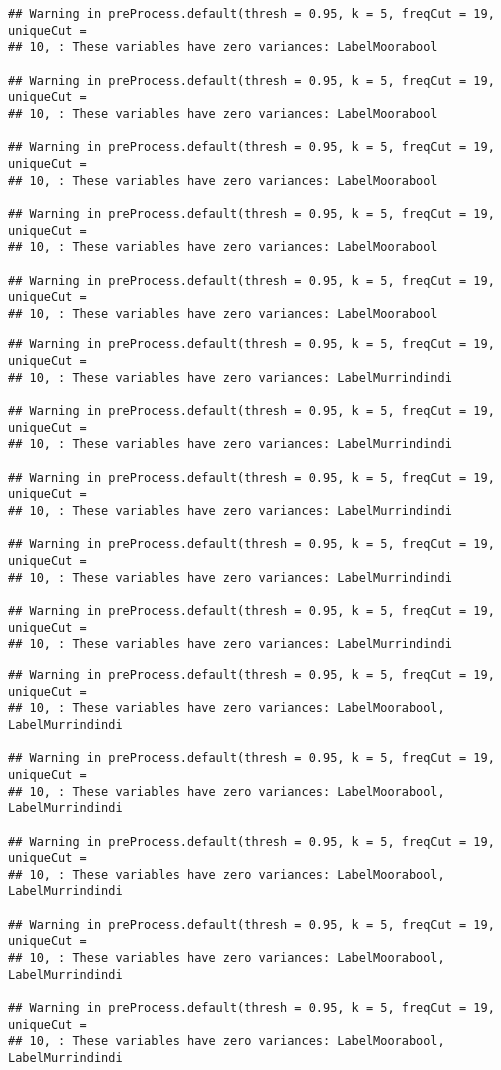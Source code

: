 \documentclass[
]{article}
\begin{document}
\begin{verbatim}
## Warning in preProcess.default(thresh = 0.95, k = 5, freqCut = 19, uniqueCut =
## 10, : These variables have zero variances: LabelMoorabool

## Warning in preProcess.default(thresh = 0.95, k = 5, freqCut = 19, uniqueCut =
## 10, : These variables have zero variances: LabelMoorabool

## Warning in preProcess.default(thresh = 0.95, k = 5, freqCut = 19, uniqueCut =
## 10, : These variables have zero variances: LabelMoorabool

## Warning in preProcess.default(thresh = 0.95, k = 5, freqCut = 19, uniqueCut =
## 10, : These variables have zero variances: LabelMoorabool

## Warning in preProcess.default(thresh = 0.95, k = 5, freqCut = 19, uniqueCut =
## 10, : These variables have zero variances: LabelMoorabool
\end{verbatim}

\begin{verbatim}
## Warning in preProcess.default(thresh = 0.95, k = 5, freqCut = 19, uniqueCut =
## 10, : These variables have zero variances: LabelMurrindindi

## Warning in preProcess.default(thresh = 0.95, k = 5, freqCut = 19, uniqueCut =
## 10, : These variables have zero variances: LabelMurrindindi

## Warning in preProcess.default(thresh = 0.95, k = 5, freqCut = 19, uniqueCut =
## 10, : These variables have zero variances: LabelMurrindindi

## Warning in preProcess.default(thresh = 0.95, k = 5, freqCut = 19, uniqueCut =
## 10, : These variables have zero variances: LabelMurrindindi

## Warning in preProcess.default(thresh = 0.95, k = 5, freqCut = 19, uniqueCut =
## 10, : These variables have zero variances: LabelMurrindindi
\end{verbatim}

\begin{verbatim}
## Warning in preProcess.default(thresh = 0.95, k = 5, freqCut = 19, uniqueCut =
## 10, : These variables have zero variances: LabelMoorabool, LabelMurrindindi

## Warning in preProcess.default(thresh = 0.95, k = 5, freqCut = 19, uniqueCut =
## 10, : These variables have zero variances: LabelMoorabool, LabelMurrindindi

## Warning in preProcess.default(thresh = 0.95, k = 5, freqCut = 19, uniqueCut =
## 10, : These variables have zero variances: LabelMoorabool, LabelMurrindindi

## Warning in preProcess.default(thresh = 0.95, k = 5, freqCut = 19, uniqueCut =
## 10, : These variables have zero variances: LabelMoorabool, LabelMurrindindi

## Warning in preProcess.default(thresh = 0.95, k = 5, freqCut = 19, uniqueCut =
## 10, : These variables have zero variances: LabelMoorabool, LabelMurrindindi
\end{verbatim}
\end{document}
